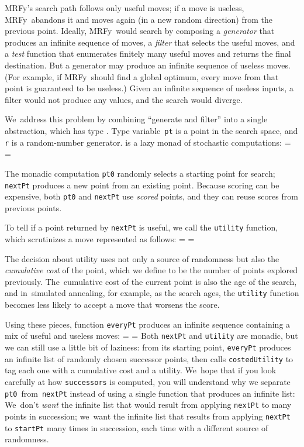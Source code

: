 \documentclass[preprint,nonatbib,blockstyle,times]{sigplanconf}
\newcommand\mrfy{MRFy} %
\newif\ifverbatimsmall
\newcommand\smallverbatiminput[1]{%
  \verbatimsmalltrue
  \presvtopsep=\topsep
  \topsep=0.78\topsep
  \verbatimsmallfalse
  \topsep=\presvtopsep
}
\newcommand\smallfuzzverbatiminput[2]{%
  \hfuzz=#1 \smallverbatiminput{#2}\hfuzz=0pt }
\begin{document}
\mrfy's search path follows only useful moves;
if a move is useless, 
\mrfy\ abandons it and moves again (in a new random direction) from the
previous point.
Ideally, \mrfy\ would search by composing a \emph{generator}
that produces an infinite sequence of moves, 
a \emph{filter} that selects the useful moves, and 
a \emph{test} function that enumerates finitely many useful moves
and returns the final destination.
But a generator may produce an infinite sequence of useless moves.
(For example, if \mrfy\ should find a global optimum, every move from
that point is guaranteed to be useless.)
Given an infinite sequence of useless inputs, a filter would not
produce any values, and the search would diverge.





We~address this problem by combining ``generate and filter'' into a
single abstraction, which has type .
Type variable~\texttt{pt} is a point in the search
space, and \texttt{r} is a
random-number generator.
 is a lazy monad of stochastic computations:
\smallverbatiminput{gen.tex}
The monadic computation \texttt{pt0} randomly selects a starting point
for search;
\texttt{nextPt} produces a new point from
an existing point.
Because scoring can be expensive, both \texttt{pt0}
and \texttt{nextPt} use \emph{scored} points, and they can
reuse scores from previous points.

To tell if a point returned by \texttt{nextPt} is useful, we call
 the \texttt{utility} function,
which scrutinizes a move represented as follows:
\smallverbatiminput{move}
The decision about utility uses not only a source of randomness but
also the \emph{cumulative cost} of the point, which we define to be
the number of points explored previously.
The~cumulative cost of the current point is also the age of the
search,
and
in~simulated annealing, for example, as the search ages,
the \texttt{utility} function becomes less likely to accept a move
that worsens the score.

\noindent
\vbox{
Using these pieces, function \texttt{everyPt} produces an infinite
sequence containing a mix of useful and useless moves:
\smallfuzzverbatiminput{10.8pt}{everygen}
}
\noindent
Both \texttt{nextPt} and \texttt{utility} are monadic, but 
we can still use a little bit of
laziness:
from its starting point, \texttt{everyPt} produces an infinite list of
randomly chosen successor points, then calls \texttt{costedUtility} to
tag each one with a cumulative cost and a utility.
We~hope that if you look carefully at how \texttt{successors} is computed,
you will understand why we
separate \texttt{pt0}~from~\texttt{nextPt} instead of using a single
function that produces an infinite list:
We~don't \emph{want} the infinite list that would result from
applying \texttt{nextPt} to many points in succession;
we~want the infinite list that results from applying \texttt{nextPt}
to \texttt{startPt} many times in succession, each time with a
different source of randomness.
\end{document}
